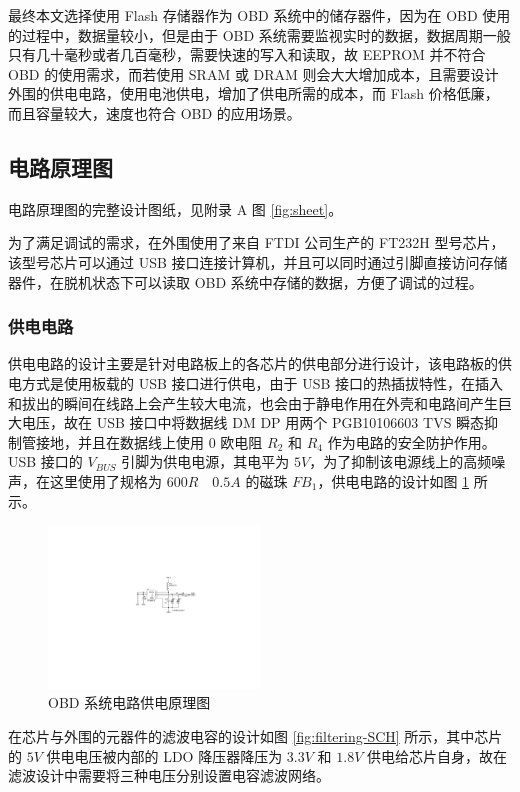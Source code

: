 最终本文选择使用 Flash 存储器作为 OBD 系统中的储存器件，因为在 OBD 使用的过程中，数据量较小，但是由于 OBD 系统需要监视实时的数据，数据周期一般只有几十毫秒或者几百毫秒，需要快速的写入和读取，故 EEPROM 并不符合 OBD 的使用需求，而若使用 SRAM 或 DRAM 则会大大增加成本，且需要设计外围的供电电路，使用电池供电，增加了供电所需的成本，而 Flash 价格低廉，而且容量较大，速度也符合 OBD 的应用场景。

\subsection{电路原理图}
电路原理图的完整设计图纸，见附录 A 图 \ref{fig:sheet}。

为了满足调试的需求，在外围使用了来自 FTDI 公司生产的 FT232H 型号芯片，该型号芯片可以通过 USB 接口连接计算机，并且可以同时通过引脚直接访问存储器件，在脱机状态下可以读取 OBD 系统中存储的数据，方便了调试的过程。

\subsubsection{供电电路}
供电电路的设计主要是针对电路板上的各芯片的供电部分进行设计，该电路板的供电方式是使用板载的 USB 接口进行供电，由于 USB 接口的热插拔特性，在插入和拔出的瞬间在线路上会产生较大电流，也会由于静电作用在外壳和电路间产生巨大电压，故在 USB 接口中将数据线 DM DP 用两个 PGB10106603 TVS 瞬态抑制管接地，并且在数据线上使用 0 欧电阻 $R_2$ 和 $R_4$ 作为电路的安全防护作用。USB 接口的 $V_{BUS}$ 引脚为供电电源，其电平为 $5V$，为了抑制该电源线上的高频噪声，在这里使用了规格为 $600R \quad 0.5A$ 的磁珠 $FB_1$，供电电路的设计如图 \ref{fig:USB-SCH} 所示。

\begin{figure}
	\centering
	\includegraphics[width=0.5\textwidth]{figures/USB-SCH.pdf}
	\caption{OBD 系统电路供电原理图}\label{fig:USB-SCH}
\end{figure}

在芯片与外围的元器件的滤波电容的设计如图 \ref{fig:filtering-SCH} 所示，其中芯片的 $5V$ 供电电压被内部的 LDO 降压器降压为 $3.3V$ 和 $1.8V$ 供电给芯片自身，故在滤波设计中需要将三种电压分别设置电容滤波网络。

